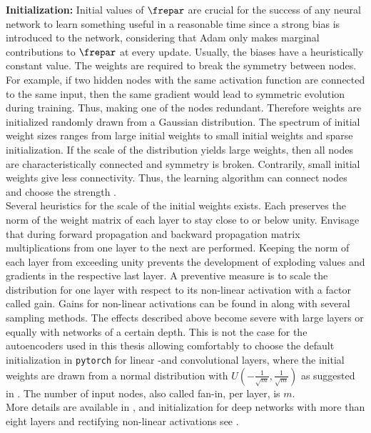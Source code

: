 \textbf{Initialization:}
Initial values of \(\frepar\) are crucial for the success of any neural network to learn something useful in a reasonable time since a strong bias is introduced to the network, considering that Adam only makes marginal contributions to \(\frepar\) at every update. Usually, the biases have a heuristically constant value. The weights are required to break the symmetry between nodes. For example, if two hidden nodes with the same activation function are connected to the same input, then the same gradient would lead to symmetric evolution during training. Thus, making one of the nodes redundant. Therefore weights are initialized randomly drawn from a Gaussian distribution. The spectrum of initial weight sizes ranges from large initial weights to small initial weights and sparse initialization. If the scale of the distribution yields large weights, then all nodes are characteristically connected and symmetry is broken. Contrarily, small initial weights give less connectivity. Thus, the learning algorithm can connect nodes and choose the strength \cite{Goodfellow}.\\
Several heuristics for the scale of the initial weights exists. Each preserves the norm of the weight matrix of each layer to stay close to or below unity. Envisage that during forward propagation and backward propagation matrix multiplications from one layer to the next are performed. Keeping the norm of each layer from exceeding unity prevents the development of exploding values and gradients in the respective last layer. A preventive measure is to scale the distribution for one layer with respect to its non-linear activation with a factor called gain. Gains for non-linear activations can be found in \cite{torch_ini} along with several sampling methods. The effects described above become severe with large layers or equally with networks of a certain depth. This is not the case for the autoencoders used in this thesis allowing comfortably to choose the default initialization in \texttt{pytorch} for linear -and convolutional layers, where the initial weights are drawn from a normal distribution with \(U(-\frac{1}{\sqrt{m}},\frac{1}{\sqrt{m}})\) as suggested in \cite{LeCun98}. The number of input nodes, also called fan-in, per layer, is \(m\).\\
More details are available in \cite{Goodfellow}, and initialization for deep networks with more than eight layers and rectifying non-linear activations see \cite{he2015}.\\

